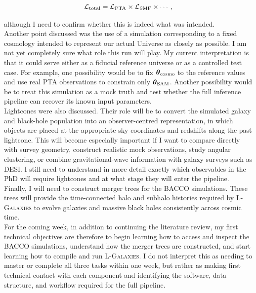 \documentclass[10.9pt,a4paper,twoside]{article}
\begin{document}
\[
\mathcal{L}_{\rm total}
=
\mathcal{L}_{\rm PTA}
\times
\mathcal{L}_{\rm SMF}
\times
\cdots,
\]

although I need to confirm whether this is indeed what was intended. \\

Another point discussed was the use of a simulation corresponding to a fixed cosmology intended to represent our actual Universe as closely as possible. I am not yet completely sure what role this run will play. My current interpretation is that it could serve either as a fiducial reference universe or as a controlled test case. For example, one possibility would be to fix $\boldsymbol{\theta}_{\rm cosmo}$ to the reference values and use real PTA observations to constrain only $\boldsymbol{\theta}_{\rm SAM}$. Another possibility would be to treat this simulation as a mock truth and test whether the full inference pipeline can recover its known input parameters. \\

Lightcones were also discussed. Their role will be to convert the simulated galaxy and black-hole population into an observer-centred representation, in which objects are placed at the appropriate sky coordinates and redshifts along the past lightcone. This will become especially important if I want to compare directly with survey geometry, construct realistic mock observations, study angular clustering, or combine gravitational-wave information with galaxy surveys such as DESI. I still need to understand in more detail exactly which observables in the PhD will require lightcones and at what stage they will enter the pipeline. \\

Finally, I will need to construct merger trees for the BACCO simulations. These trees will provide the time-connected halo and subhalo histories required by \textsc{L-Galaxies} to evolve galaxies and massive black holes consistently across cosmic time. \\

For the coming week, in addition to continuing the literature review, my first technical objectives are therefore to begin learning how to access and inspect the BACCO simulations, understand how the merger trees are constructed, and start learning how to compile and run \textsc{L-Galaxies}. I do not interpret this as needing to master or complete all three tasks within one week, but rather as making first technical contact with each component and identifying the software, data structure, and workflow required for the full pipeline.
\end{document}
